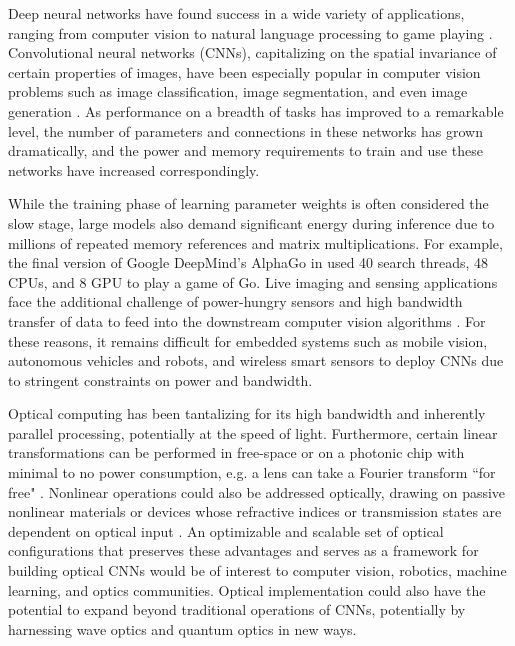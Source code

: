 Deep neural networks have found success in a wide variety of applications, ranging from computer vision to natural language processing to game playing \cite{lecun2015deep}. Convolutional neural networks (CNNs), capitalizing on the spatial invariance of certain properties of images, have been especially popular in computer vision problems such as image classification, image segmentation, and even image generation \cite{krizhevsky2012imagenet,goodfellow2014generative,long2015fully}. As performance on a breadth of tasks has improved to a remarkable level, the number of parameters and connections in these networks has grown dramatically, and the power and memory requirements to train and use these networks have increased correspondingly. 

While the training phase of learning parameter weights is often considered the slow stage, large models also demand significant energy during inference due to millions of repeated memory references and matrix multiplications. For example, the final version of Google DeepMind's AlphaGo in \cite{silver2016mastering} used 40 search threads, 48 CPUs, and 8 GPU to play a game of Go. Live imaging and sensing applications face the additional challenge of power-hungry sensors and high bandwidth transfer of data to feed into the downstream computer vision algorithms \cite{likamwa2013energy}. For these reasons, it remains difficult for embedded systems such as mobile vision, autonomous vehicles and robots, and wireless smart sensors to deploy CNNs due to stringent constraints on power and bandwidth. 

Optical computing has been tantalizing for its high bandwidth and inherently parallel processing, potentially at the speed of light. Furthermore, certain linear transformations can be performed in free-space or on a photonic chip with minimal to no power consumption, e.g. a lens can take a Fourier transform ``for free" \cite{yang2013chip,goodman2008introduction}. Nonlinear operations could also be addressed optically, drawing on passive nonlinear materials or devices whose refractive indices or transmission states are dependent on optical input \cite{gibbs2012optical,christodoulides2010nonlinear}. An optimizable and scalable set of optical configurations that preserves these advantages and serves as a framework for building optical CNNs would be of interest to computer vision, robotics, machine learning, and optics communities. Optical implementation could also have the potential to expand beyond traditional operations of CNNs, potentially by harnessing wave optics and quantum optics in new ways. 

